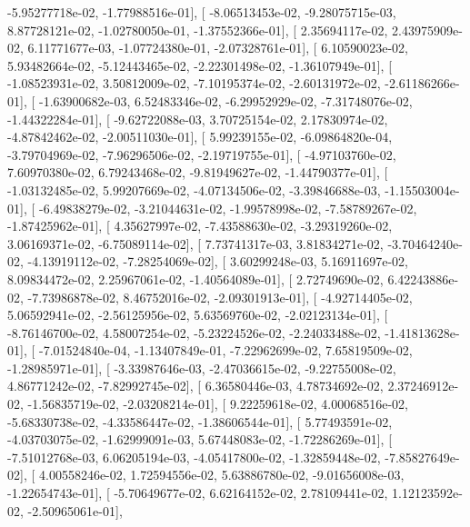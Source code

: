 \documentclass{article}
\begin{document}
         -5.95277718e-02,  -1.77988516e-01],
       [ -8.06513453e-02,  -9.28075715e-03,   8.87728121e-02,
         -1.02780050e-01,  -1.37552366e-01],
       [  2.35694117e-02,   2.43975909e-02,   6.11771677e-03,
         -1.07724380e-01,  -2.07328761e-01],
       [  6.10590023e-02,   5.93482664e-02,  -5.12443465e-02,
         -2.22301498e-02,  -1.36107949e-01],
       [ -1.08523931e-02,   3.50812009e-02,  -7.10195374e-02,
         -2.60131972e-02,  -2.61186266e-01],
       [ -1.63900682e-03,   6.52483346e-02,  -6.29952929e-02,
         -7.31748076e-02,  -1.44322284e-01],
       [ -9.62722088e-03,   3.70725154e-02,   2.17830974e-02,
         -4.87842462e-02,  -2.00511030e-01],
       [  5.99239155e-02,  -6.09864820e-04,  -3.79704969e-02,
         -7.96296506e-02,  -2.19719755e-01],
       [ -4.97103760e-02,   7.60970380e-02,   6.79243468e-02,
         -9.81949627e-02,  -1.44790377e-01],
       [ -1.03132485e-02,   5.99207669e-02,  -4.07134506e-02,
         -3.39846688e-03,  -1.15503004e-01],
       [ -6.49838279e-02,  -3.21044631e-02,  -1.99578998e-02,
         -7.58789267e-02,  -1.87425962e-01],
       [  4.35627997e-02,  -7.43588630e-02,  -3.29319260e-02,
          3.06169371e-02,  -6.75089114e-02],
       [  7.73741317e-03,   3.81834271e-02,  -3.70464240e-02,
         -4.13919112e-02,  -7.28254069e-02],
       [  3.60299248e-03,   5.16911697e-02,   8.09834472e-02,
          2.25967061e-02,  -1.40564089e-01],
       [  2.72749690e-02,   6.42243886e-02,  -7.73986878e-02,
          8.46752016e-02,  -2.09301913e-01],
       [ -4.92714405e-02,   5.06592941e-02,  -2.56125956e-02,
          5.63569760e-02,  -2.02123134e-01],
       [ -8.76146700e-02,   4.58007254e-02,  -5.23224526e-02,
         -2.24033488e-02,  -1.41813628e-01],
       [ -7.01524840e-04,  -1.13407849e-01,  -7.22962699e-02,
          7.65819509e-02,  -1.28985971e-01],
       [ -3.33987646e-03,  -2.47036615e-02,  -9.22755008e-02,
          4.86771242e-02,  -7.82992745e-02],
       [  6.36580446e-03,   4.78734692e-02,   2.37246912e-02,
         -1.56835719e-02,  -2.03208214e-01],
       [  9.22259618e-02,   4.00068516e-02,  -5.68330738e-02,
         -4.33586447e-02,  -1.38606544e-01],
       [  5.77493591e-02,  -4.03703075e-02,  -1.62999091e-03,
          5.67448083e-02,  -1.72286269e-01],
       [ -7.51012768e-03,   6.06205194e-03,  -4.05417800e-02,
         -1.32859448e-02,  -7.85827649e-02],
       [  4.00558246e-02,   1.72594556e-02,   5.63886780e-02,
         -9.01656008e-03,  -1.22654743e-01],
       [ -5.70649677e-02,   6.62164152e-02,   2.78109441e-02,
          1.12123592e-02,  -2.50965061e-01],
\end{document}
